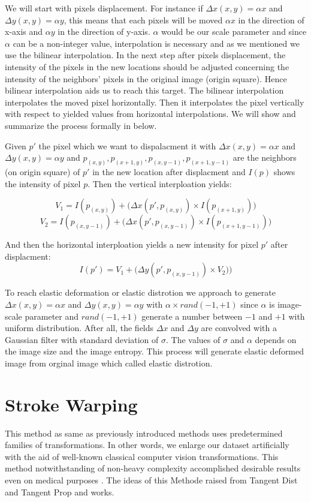 We will start with pixels displacement. For instance if $\Delta x(x,y)= \alpha x$ and $\Delta y(x,y)= \alpha y$, this means that each pixels will be moved $\alpha x$ in the direction of x-axis and
$\alpha y$ in the direction of y-axis. $\alpha$ would be our scale parameter and since $\alpha$ can be a non-integer value, interpolation is necessary and as we mentioned we use the bilinear
interpolation.  In the next step after pixels displacement, the intensity of the pixels in the new locations should be adjusted concerning the intensity of the neighbors' pixels in the original image
(origin square). Hence bilinear interpolation aids us to reach this target. The bilinear interpolation interpolates the moved pixel horizontally. Then it interpolates the pixel vertically with respect
to yielded values from horizontal interpolations. We will show and summarize the process formally in below.

\begin{definition}{}
  Given $p'$ the pixel which we want to dispalacment it with $\Delta x(x,y)= \alpha x$ and $\Delta y(x,y)= \alpha y$ and $p_{(x,y)}, p_{(x+1,y)}, p_{(x,y-1)}, p_{(x+1,y-1)}$ are the neighbors (on
  origin square) of $p'$ in the new location after displacment and $I(p)$ shows the intensity of pixel $p$. Then the vertical interploation yields:

  $$V_1 = I(p_{(x,y)}) + \big( \Delta x(p', p_{(x,y)}) \times I(p_{(x+1,y)}) \big)$$
  $$V_2 = I(p_{(x,y-1)}) + \big( \Delta x(p', p_{(x,y-1)}) \times I(p_{(x+1,y-1)}) \big)$$

  And then the horizontal interploation yields a new intensity for pixel $p'$ after displacment:
  $$I(p') = V_1 + \big( \Delta y(p', p_{(x,y-1)}) \times V_2) \big)$$
\end{definition}

To reach elastic deformation or elastic distrotion we approach to generate $\Delta x(x,y)= \alpha x$ and $\Delta y(x,y)= \alpha y$ with $\alpha \times rand(-1,+1)$ since $\alpha$ is image-scale parameter
and $rand(-1,+1)$ generate a number between $-1$ and $+1$ with uniform distribution. After all, the
fields $\Delta x$ and $\Delta y$ are convolved with a Gaussian filter with standard deviation of
$\sigma$. The values of $\sigma$ and $\alpha$ depends on the image size and the image entropy. This process will generate elastic deformed image from orginal image which called elastic distrotion.


\section{Stroke Warping}
\label{tit:stroke-warping}
This method as same as previously introduced methods uses predetermined families of transformations.
In other words, we enlarge our dataset artificially with the aid of well-known classical computer
vision transformations. This method notwithstanding of non-heavy complexity accomplished desirable
results even on medical purposes \cite{stroke_tumor}. The ideas of this Methode raised from Tangent
Dist and Tangent Prop \cite{stroke_idea_1992} and \cite{stroke_idea_1993} works. 

